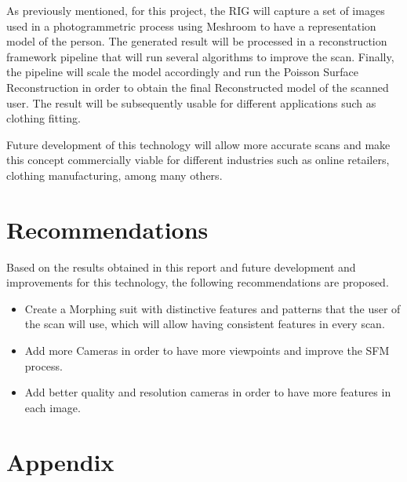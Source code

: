 \documentclass[12pt]{report}
\begin{document}
As previously mentioned, for this project, the RIG will capture a set of images used in a photogrammetric process using Meshroom to have a representation model of the person. 
The generated result will be processed in a reconstruction framework pipeline that will run several algorithms to improve the scan. 
Finally, the pipeline will scale the model accordingly and run the Poisson Surface Reconstruction in order to obtain the final Reconstructed model of the scanned user. 
The result will be subsequently usable for different applications such as clothing fitting. 

Future development of this technology will allow more accurate scans and make this concept commercially viable for different industries such as online retailers, clothing manufacturing, among many others.


\chapter{Recommendations}

Based on the results obtained in this report and future development and improvements for this technology, the following recommendations are proposed.

\begin{itemize}
  \item Create a Morphing suit with distinctive features and patterns that the user of the scan will use, which will allow having consistent features in every scan.
  \item Add more Cameras in order to have more viewpoints and improve the SFM process.
  \item Add better quality and resolution cameras in order to have more features in each image.
\end{itemize}




\nocite{*}   %




\appendix
\chapter{\vspace{-5.5cm}Appendix}



\end{document}
